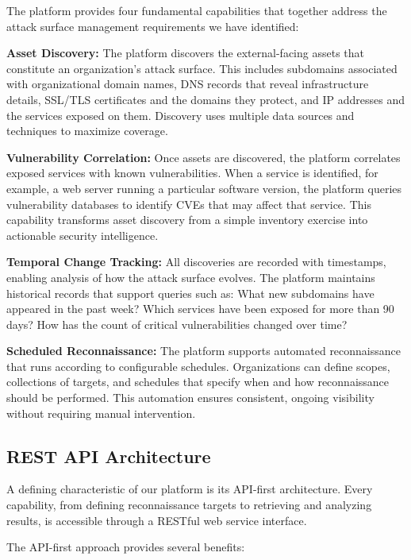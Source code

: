 \documentclass[a4paper,12pt]{report}
\begin{document}
The platform provides four fundamental capabilities that together address the attack surface management requirements we have identified:\hfill \break

\textbf{Asset Discovery:} The platform discovers the external-facing assets that constitute an organization's attack surface. This includes subdomains associated with organizational domain names, DNS records that reveal infrastructure details, SSL/TLS certificates and the domains they protect, and IP addresses and the services exposed on them. Discovery uses multiple data sources and techniques to maximize coverage.\hfill \break

\textbf{Vulnerability Correlation:} Once assets are discovered, the platform correlates exposed services with known vulnerabilities. When a service is identified, for example, a web server running a particular software version, the platform queries vulnerability databases to identify CVEs that may affect that service. This capability transforms asset discovery from a simple inventory exercise into actionable security intelligence.\hfill \break

\textbf{Temporal Change Tracking:} All discoveries are recorded with timestamps, enabling analysis of how the attack surface evolves. The platform maintains historical records that support queries such as: What new subdomains have appeared in the past week? Which services have been exposed for more than 90 days? How has the count of critical vulnerabilities changed over time?\hfill \break

\textbf{Scheduled Reconnaissance:} The platform supports automated reconnaissance that runs according to configurable schedules. Organizations can define scopes, collections of targets, and schedules that specify when and how reconnaissance should be performed. This automation ensures consistent, ongoing visibility without requiring manual intervention.\hfill \break

\subsection{REST API Architecture}

A defining characteristic of our platform is its API-first architecture. Every capability, from defining reconnaissance targets to retrieving and analyzing results, is accessible through a RESTful web service interface.\hfill \break

The API-first approach provides several benefits:\hfill \break
\end{document}
